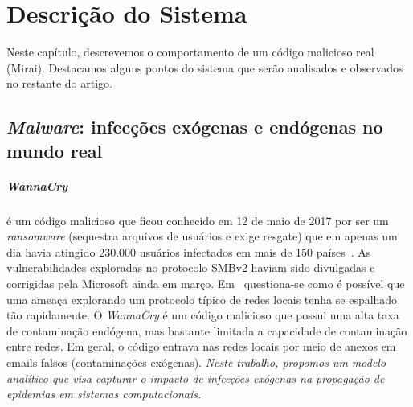 
\chapter{Descrição do Sistema}
\label{cap:descricao}


Neste capítulo, descrevemos  o comportamento de um código malicioso real (Mirai). Destacamos alguns pontos do sistema que serão analisados e observados no restante do artigo.

\section{\emph{Malware}: infecções exógenas e endógenas no mundo real}

		\paragraph*{WannaCry} é um código malicioso que ficou conhecido em 12 de maio de 2017 por ser um \textit{ransomware} (sequestra arquivos de usuários e exige resgate) que em apenas um dia havia atingido $230.000$ usuários infectados em mais de 150 países~\cite{lee2017ramsomware}. As vulnerabilidades exploradas no protocolo SMBv2 haviam sido divulgadas e corrigidas pela Microsoft ainda em março. %
		Em~\cite{lee2017ramsomware} questiona-se como é possível que uma ameaça  explorando um protocolo típico de redes locais tenha se espalhado tão rapidamente. O \emph{WannaCry} é um código malicioso que possui uma alta taxa de contaminação endógena, mas bastante limitada a capacidade de contaminação entre redes.  Em geral, o código entrava nas redes locais por meio de anexos em emails falsos (contaminações exógenas).   \emph{Neste trabalho, propomos um modelo analítico que visa capturar o impacto de infecções exógenas na propagação de epidemias em sistemas computacionais.}  
		

